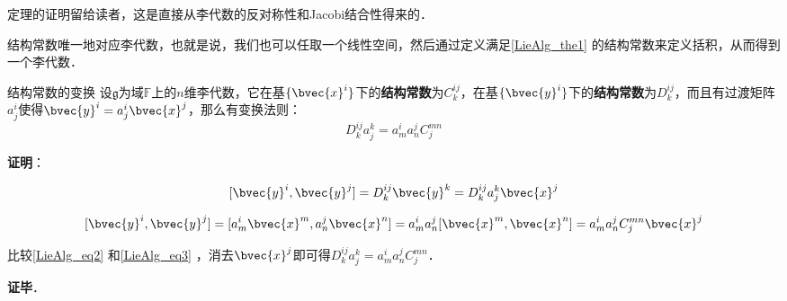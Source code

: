 定理的证明留给读者，这是直接从李代数的反对称性和Jacobi结合性得来的．

结构常数唯一地对应李代数，也就是说，我们也可以任取一个线性空间，然后通过定义满足\autoref{LieAlg_the1} 的结构常数来定义括积，从而得到一个李代数．

\begin{theorem}{结构常数的变换}
设$\mathfrak{g}$为域$\mathbb{F}$上的$n$维李代数，它在基$\{\bvec{x}^i\}$下的\textbf{结构常数}为$C_k^{ij}$，在基$\{\bvec{y}^i\}$下的\textbf{结构常数}为$D_k^{ij}$，而且有过渡矩阵$a^i_j$使得$\bvec{y}^i=a^i_j\bvec{x}^j$，那么有变换法则：
\begin{equation}
D^{ij}_ka^k_j=a^i_ma^j_nC_j^{mn}
\end{equation}

\end{theorem}

\textbf{证明}：

\begin{equation}\label{LieAlg_eq2}
[\bvec{y}^i, \bvec{y}^j]=D^{ij}_k\bvec{y}^k=D^{ij}_ka^k_j\bvec{x}^j
\end{equation}

\begin{equation}\label{LieAlg_eq3}
[\bvec{y}^i, \bvec{y}^j]=[a^i_m\bvec{x}^m, a^j_n\bvec{x}^n]=a^i_ma^j_n[\bvec{x}^m, \bvec{x}^n]=a^i_ma^j_nC_j^{mn}\bvec{x}^j
\end{equation}

比较\autoref{LieAlg_eq2} 和\autoref{LieAlg_eq3} ，消去$\bvec{x}^j$即可得$D^{ij}_ka^k_j=a^i_ma^j_nC_j^{mn}$．

\textbf{证毕}．





